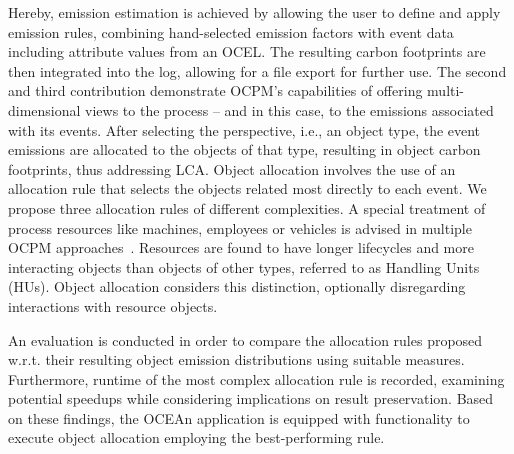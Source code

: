 Hereby, emission estimation is achieved by allowing the user to define and apply emission rules, combining hand-selected emission factors with event data including attribute values from an OCEL.
The resulting carbon footprints are then integrated into the log, allowing for a file export for further use.
%
The second and third contribution demonstrate OCPM's capabilities of offering multi-dimensional views to the process -- and in this case, to the emissions associated with its events.
After selecting the perspective, i.e., an object type, the event emissions are allocated to the objects of that type, resulting in object carbon footprints, thus addressing LCA.
%
Object allocation involves the use of an allocation rule that selects the objects related most directly to each event. We propose three allocation rules of different complexities.
A special treatment of process resources like machines, employees or vehicles is advised in multiple OCPM approaches~\cite{Graves23rethink,Fahland22process}.
Resources are found to have longer lifecycles and more interacting objects than objects of other types, referred to as Handling Units (HUs).
Object allocation considers this distinction, optionally disregarding interactions with resource objects.

An evaluation is conducted in order to compare the allocation rules proposed
w.r.t. their resulting object emission distributions using suitable measures.
Furthermore, runtime of the most complex allocation rule is recorded, examining potential speedups while considering implications on result preservation.
Based on these findings, the OCEAn application is equipped with functionality to execute object allocation employing the best-performing rule.

